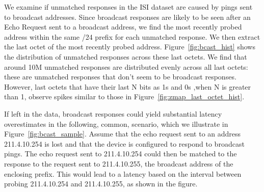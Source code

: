 We examine if unmatched responses in the ISI dataset are caused by pings sent to broadcast addresses.
%
Since broadcast responses are likely to be seen after an
Echo Request sent to a broadcast address, we find
the most recently probed address within the same /24 prefix for each
unmatched response. 
%
We then extract the last octet of the most recently probed
address.
%
Figure~\ref{fig:bcast_hist} shows the
distribution of unmatched responses across these last octets. 
%
We find that around 10M unmatched responses are distributed evenly
across all last octets: these are unmatched responses that don't seem
to be broadcast responses.
%
However, last octets that have their last N bits as 1s and 0s
,when N is greater than 1, observe spikes similar to those in Figure~\ref{fig:zmap_last_octet_hist}.
%
%

If left in the data, broadcast responses could yield
substantial latency overestimates in the following, common,
scenario, which we illustrate in
Figure~\ref{fig:bcast_sample}.
%
Assume that the echo request
sent to an address 211.4.10.254 is lost and that the
device is configured to respond to broadcast pings.  
%
The
echo request sent to 211.4.10.254 could then be matched to
the response to the request sent to 211.4.10.255, the
broadcast address of the enclosing prefix.  
%
This would lead
to a latency based on the interval between probing
211.4.10.254 and 211.4.10.255, as shown in the figure.

